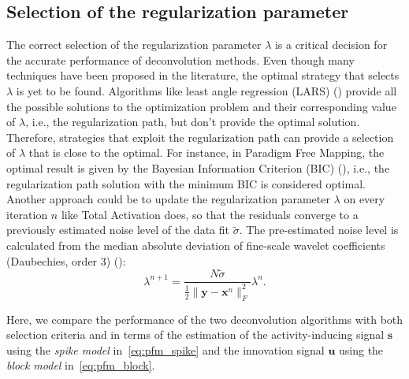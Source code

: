 \subsection{Selection of the regularization parameter}

The correct selection of the regularization parameter \(\lambda\) is a critical decision for the accurate performance of deconvolution methods. Even though many techniques have been proposed in the literature, the optimal strategy that selects \(\lambda\) is yet to be found. Algorithms like least angle regression (LARS) (\citealt{efron2004LeastAngleRegression}) provide all the possible solutions to the optimization problem and their corresponding value of \(\lambda\), i.e., the regularization path, but don't provide the optimal solution. Therefore, strategies that exploit the regularization path can provide a selection of \(\lambda\) that is close to the optimal. For instance, in Paradigm Free Mapping, the optimal result is given by the Bayesian Information Criterion (BIC) (\citealt{schwarz1978EstimatingDimensionModel}), i.e., the regularization path solution with the minimum BIC is considered optimal. Another approach could be to update the regularization parameter \(\lambda\) on every iteration \(n\) like Total Activation does, so that the residuals converge to a previously estimated noise level of the data fit \(\tilde{\sigma}\). The pre-estimated noise level is calculated from the median absolute deviation of fine-scale wavelet coefficients (Daubechies, order 3) (\citealt{karahanoglu2013TotalActivationFMRI}):
\begin{equation}
    \lambda^{n+1} = \frac{N \tilde{\sigma}}{\frac{1}{2} \| \mathbf{y} - \mathbf{x}^n \|_F^2} \lambda^n.
\label{eq:std}
\end{equation}

Here, we compare the performance of the two deconvolution algorithms with both selection criteria and in terms of the estimation of the activity-inducing signal \(\mathbf{s}\) using the \textit{spike model} in~\eqref{eq:pfm_spike} and the innovation signal \(\mathbf{u}\) using the \textit{block model} in~\eqref{eq:pfm_block}.
